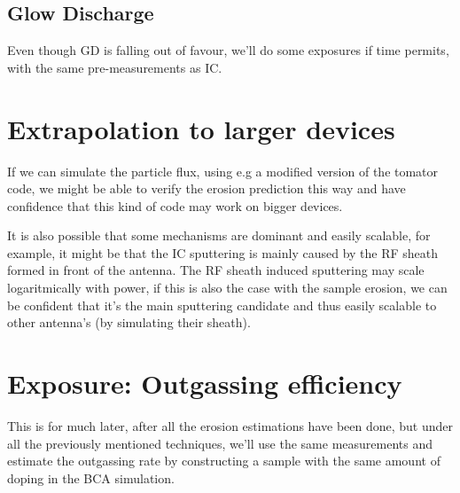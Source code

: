 \documentclass{article}
\begin{document}
\subsection{Glow Discharge}
Even though GD is falling out of favour, we'll do some exposures if time permits, with the same 
pre-measurements as IC.
\section{Extrapolation to larger devices}
If we can simulate the particle flux, using e.g a modified version of the tomator code, 
we might be able to verify the erosion prediction this way and have confidence that this
kind of code may work on bigger devices.

It is also possible that some mechanisms are dominant and easily scalable, for
example, it might be that the IC sputtering is mainly caused by the RF sheath
formed in front of the antenna.  The RF sheath induced sputtering may scale
logaritmically with power, if this is also the case with the sample erosion, we
can be confident that it's the main sputtering candidate and thus easily
scalable to other antenna's (by simulating their sheath).

\section{Exposure: Outgassing efficiency}
This is for much later, after all the erosion estimations have been done, but
under all the previously mentioned techniques, we'll use the same measurements
and estimate the outgassing rate by constructing a sample with the same amount
of doping in the BCA simulation.
\end{document}
